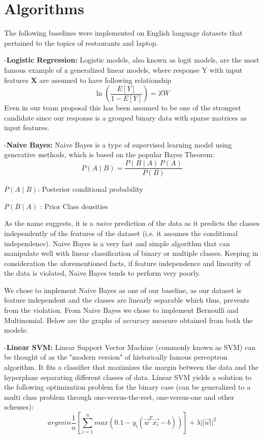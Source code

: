 \documentclass[comsoc,conference]{IEEEtran}
\begin{document}
\newpage
\section{Algorithms}
The following baselines were implemented on English language datasets that pertained to the topics of restaurants and laptop.

-\textbf{Logistic Regression:} Logistic models, also known as logit models, are the most famous example of a generalized linear models, where response Y with input features $\mathbf{X}$ are assumed to have following relationship
\[\ln(\frac{E[Y]}{1-E[Y]}) = \mathbb{X}W\]
Even in our team proposal this has been assumed to be one of the strongest candidate since our response is a grouped binary data with sparse matrices as input features.

-\textbf{Naive Bayes:} Naive Bayes is a type of supervised learning model using generative methods, which is based on the popular Bayes Theorem: 
$$ P(A \mid B) = \frac{P(B \mid A) \, P(A)}{P(B)} $$

$ P(A \mid B)$: Posterior conditional probability 


${P(B \mid A) }$ : Prior Class densities

As the name suggests, it is a \textit{naive} prediction of the data as it predicts the classes independently of the features of the dataset (i.e. it assumes the conditional independence). Naive Bayes is a very fast and simple algorithm that can manipulate well with linear classification of binary or multiple classes. Keeping in consideration the aforementioned facts, if feature independence and linearity of the data is violated, Naive Bayes tends to perform very poorly. 


We chose to implement Naive Bayes as one of our baseline, as our dataset is feature independent and the classes are linearly separable which thus, prevents from the violation. From Naive Bayes we chose to implement Bernoulli and Multinomial. Below are the graphs of accuracy measure obtained from both the models:




-\textbf{Linear SVM:} Linear Support Vector Machine (commonly known as SVM) can be thought of as the "modern version" of historically famous perceptron algorithm. It fits a classifier that maximizes the margin between the data and the hyperplane separating different classes of data. Linear SVM yields a solution to the following optimization problem for the binary case (can be generalized to a multi class problem through one-versus-the-rest, one-versus-one and other schemes):
\[
argmin \frac{1}{n} [\sum_{i=1}^n max(0. 1-y_i(\vec{w}^T\vec{x_i}-b))] + \lambda||\vec{w}||^2
\]
\end{document}
